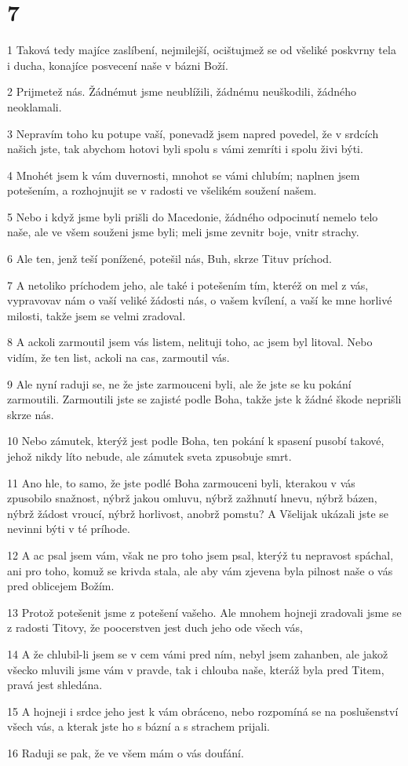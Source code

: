 \chapter{7}

\par 1 Taková tedy majíce zaslíbení, nejmilejší, ocištujmež se od všeliké poskvrny tela i ducha, konajíce posvecení naše v bázni Boží.
\par 2 Prijmetež nás. Žádnémut jsme neublížili, žádnému neuškodili, žádného neoklamali.
\par 3 Nepravím toho ku potupe vaší, ponevadž jsem napred povedel, že v srdcích našich jste, tak abychom hotovi byli spolu s vámi zemríti i spolu živi býti.
\par 4 Mnohét jsem k vám duvernosti, mnohot se vámi chlubím; naplnen jsem potešením, a rozhojnujit se v radosti ve všelikém soužení našem.
\par 5 Nebo i když jsme byli prišli do Macedonie, žádného odpocinutí nemelo telo naše, ale ve všem souženi jsme byli; meli jsme zevnitr boje, vnitr strachy.
\par 6 Ale ten, jenž teší ponížené, potešil nás, Buh, skrze Tituv príchod.
\par 7 A netoliko príchodem jeho, ale také i potešením tím, kteréž on mel z vás, vypravovav nám o vaší veliké žádosti nás,  o vašem kvílení, a vaší ke mne horlivé milosti, takže jsem se velmi zradoval.
\par 8 A ackoli zarmoutil jsem vás listem, nelituji toho, ac jsem byl litoval. Nebo vidím, že ten list, ackoli na cas, zarmoutil vás.
\par 9 Ale nyní raduji se, ne že jste zarmouceni byli, ale že jste se ku pokání zarmoutili. Zarmoutili jste se zajisté podle Boha, takže jste k žádné škode neprišli skrze nás.
\par 10 Nebo zámutek, kterýž jest podle Boha, ten pokání k spasení pusobí takové, jehož nikdy líto nebude, ale zámutek sveta zpusobuje smrt.
\par 11 Ano hle, to samo, že jste podlé Boha zarmouceni byli, kterakou v vás zpusobilo snažnost, nýbrž jakou omluvu, nýbrž zažhnutí hnevu, nýbrž bázen, nýbrž žádost vroucí, nýbrž horlivost, anobrž pomstu? A Všelijak ukázali jste se nevinni býti v té príhode.
\par 12 A ac psal jsem vám, však ne pro toho jsem psal, kterýž tu nepravost spáchal, ani pro toho, komuž se krivda stala, ale aby vám zjevena byla pilnost naše o vás pred oblicejem Božím.
\par 13 Protož potešenit jsme z potešení vašeho. Ale mnohem hojneji zradovali jsme se z radosti Titovy, že poocerstven jest duch jeho ode všech vás,
\par 14 A že chlubil-li jsem se v cem vámi pred ním, nebyl jsem zahanben, ale jakož všecko mluvili jsme vám v pravde, tak i chlouba naše, kteráž byla pred Titem, pravá jest shledána.
\par 15 A hojneji i srdce jeho jest k vám obráceno, nebo rozpomíná se na poslušenství všech vás, a kterak jste ho s bázní a s strachem prijali.
\par 16 Raduji se pak, že ve všem mám o vás doufání.

